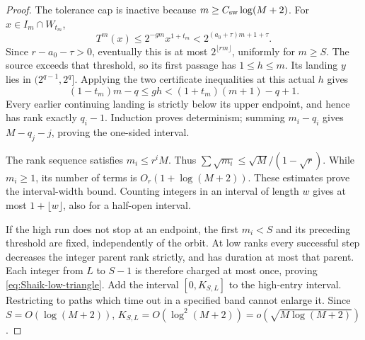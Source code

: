 \begin{proof}
The tolerance cap is inactive because \(m\ge C_{\rm sw}\log(M+2)\).
For \(x\in I_m\cap W_{t_m}\),
\[
 T^m(x)\le2^{-gm}x^{1+t_m}
 <2^{(a_0+\tau)m+1+\tau}.
\]
Since \(r-a_0-\tau>0\), eventually this is at most
\(2^{\lfloor rm\rfloor}\), uniformly for \(m\ge S\).
The source exceeds that threshold, so its first passage has
\(1\le h\le m\). Its landing \(y\) lies in \((2^{q-1},2^q]\).
Applying the two certificate inequalities at this actual \(h\) gives
\[
 (1-t_m)m-q\le gh<(1+t_m)(m+1)-q+1 .
\]
Every earlier continuing landing is strictly below its upper endpoint,
and hence has rank exactly \(q_i-1\). Induction proves determinism;
summing \(m_i-q_i\) gives \(M-q_j-j\), proving the one-sided interval.

The rank sequence satisfies \(m_i\le r^iM\). Thus
\(\sum\sqrt{m_i}\le\sqrt M/(1-\sqrt r)\).
While \(m_i\ge1\), its number of terms is
\(O_r(1+\log(M+2))\). These estimates prove the interval-width bound.
Counting integers in an interval of length \(w\) gives at most
\(1+\lfloor w\rfloor\), also for a half-open interval.

If the high run does not stop at an endpoint, the first \(m_i<S\)
and its preceding threshold are fixed, independently of the orbit.
At low ranks every successful step decreases the integer parent rank
strictly, and has duration at most that parent. Each integer from
\(L\) to \(S-1\) is therefore charged at most once, proving
\eqref{eq:Shaik-low-triangle}. Add the interval \([0,K_{S,L}]\)
to the high-entry interval. Restricting to paths which time out in
a specified band cannot enlarge it. Since \(S=O(\log(M+2))\),
\(K_{S,L}=O(\log^2(M+2))=o(\sqrt{M\log(M+2)})\).
\end{proof}

